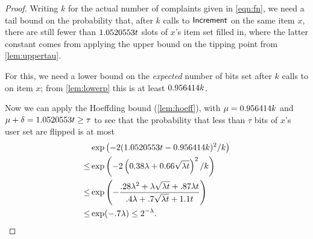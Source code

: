 \begin{proof}
   Writing $k$ for the actual number of complaints given in
   \eqref{eqn:fn}, we need a tail bound on the probability that,
   after $k$ calls to $\mathsf{Increment}{}$ on the same item $x$, there are still
   fewer than $1.0520553{}t$ slots of $x$'s item set filled in, where the latter
   constant comes from applying the upper bound on the tipping point from
   \cref{lem:uppertau}.
   
   For this, we need a lower bound on the \emph{expected} number of
   bits set after $k$ calls to \Increment{} on item $x$; from \cref{lem:lowerp}
   this is at least $0.956414{}k$.
   
   Now we can apply the Hoeffding bound (\cref{lem:hoeff}),
   with $\mu = 0.956414{}k$ and $\mu+\delta=1.0520553{}t\ge\tau$
   to see that the probability that less than $\tau$ bits of $x$'s user set
   are flipped is at most
   \begin{align*}
    &\exp\left(-2(\Cfour{}t-\Cplow{}k)^2/k\right) \\
    \le& \exp\left(-2\left(0.38\lambda + 0.66\sqrt{\lambda t}\right)^2/k\right)\\
    \le& \exp\left(-\frac{.28\lambda^2 + \lambda\sqrt{\lambda t} + .87\lambda t}%
        {.4\lambda + .7\sqrt{\lambda t} + 1.1t}\right) \\
    \le& \exp(-.7\lambda)  \le 2^{-\lambda}.
   \end{align*}
\end{proof}